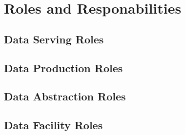 \section{Roles and Responabilities} \label{sec:roles}



\subsection{Data Serving Roles}



\subsection{Data Production Roles}




\subsection{Data Abstraction Roles}



\subsection{Data Facility Roles}




